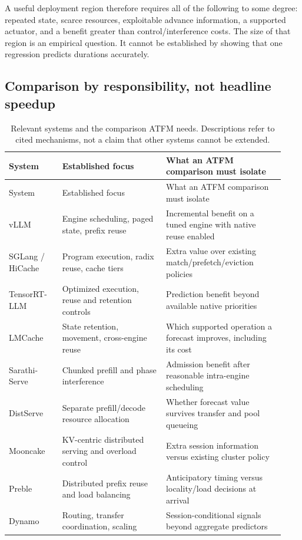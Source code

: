 A useful deployment region therefore requires all of the following to some
degree: repeated state, scarce resources, exploitable advance information,
a supported actuator, and a benefit greater than control/interference costs.
The size of that region is an empirical question. It cannot be established by
showing that one regression predicts durations accurately.

\subsection{Comparison by responsibility, not headline speedup}
\begin{longtable}{@{}p{0.18\linewidth}p{0.35\linewidth}p{0.40\linewidth}@{}}
\caption{Relevant systems and the comparison ATFM needs. Descriptions refer to
cited mechanisms, not a claim that other systems cannot be extended.}\label{tab:landscape}\\
\toprule System & Established focus & What an ATFM comparison must isolate\\\midrule
\endfirsthead
\toprule System & Established focus & What an ATFM comparison must isolate\\\midrule
\endhead
vLLM & Engine scheduling, paged state, prefix reuse & Incremental benefit on a tuned engine with native reuse enabled\\
SGLang / HiCache & Program execution, radix reuse, cache tiers & Extra value over existing match/prefetch/eviction policies\\
TensorRT-LLM & Optimized execution, reuse and retention controls & Prediction benefit beyond available native priorities\\
LMCache & State retention, movement, cross-engine reuse & Which supported operation a forecast improves, including its cost\\
Sarathi-Serve & Chunked prefill and phase interference & Admission benefit after reasonable intra-engine scheduling\\
DistServe & Separate prefill/decode resource allocation & Whether forecast value survives transfer and pool queueing\\
Mooncake & KV-centric distributed serving and overload control & Extra session information versus existing cluster policy\\
Preble & Distributed prefix reuse and load balancing & Anticipatory timing versus locality/load decisions at arrival\\
Dynamo & Routing, transfer coordination, scaling & Session-conditional signals beyond aggregate predictors\\

\end{longtable}
